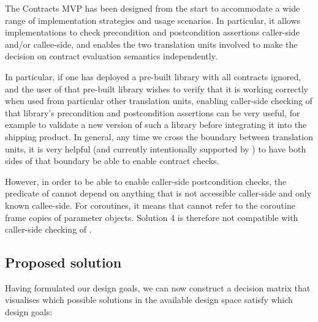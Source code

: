The Contracts MVP has been designed from the start to accommodate a wide range of implementation strategies and usage scenarios. In particular, it allows implementations to check precondition and postcondition assertions caller-side and/or callee-side, and enables the two translation units involved to make the decision on contract evaluation semantics independently.

In particular, if one has deployed a pre-built library with all contracts ignored, and the user of that pre-built library wishes to verify that it is working correctly when used from particular other translation units, enabling caller-side checking of that library's precondition and postcondition assertions can be very useful, for example to validate a new version of such a library before integrating it into the shipping product. In general, any time we cross the boundary between translation units, it is very helpful (and currently intentionally supported by \cite{P2900R8}) to have both sides of that boundary be able to enable contract checks.

However, in order to be able to enable caller-side postcondition checks, the predicate of  cannot depend on anything that is not accessible caller-side and only known callee-side. For coroutines, it means that  cannot refer to the coroutine frame copies of parameter objects. Solution 4 is therefore not compatible with caller-side checking of .


\subsection{Proposed solution}

Having formulated our design goals, we can now construct a decision matrix that visualises which possible solutions in the available design space satisfy which design goals:


